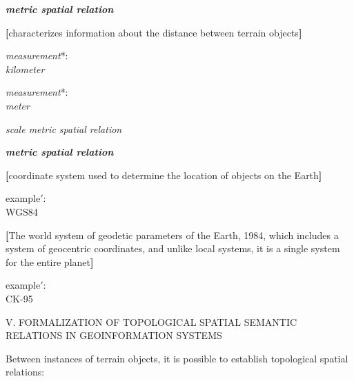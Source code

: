 \documentclass{article}
\begin{document}
\begin{multicols}{2}
    \noindent \textit{\textbf{metric spatial relation}}
    \vspace{-0.3cm}
    \begin{description}[leftmargin=!, labelwidth=1cm, itemsep=-1.5mm]
        \item[$\coloneqq$] \textbf{[}characterizes information about the distance between terrain objects\textbf{]}
        \item[$\Rightarrow$] \textit{measurement}*: \\ \textit{kilometer}
        \item[$\Rightarrow$] \textit{measurement}*: \\ \textit{meter}
        \item[$\supset$] \textit{scale metric spatial relation}
    \end{description}

        \noindent \textit{\textbf{metric spatial relation}}
    \vspace{-0.3cm}
    \begin{description}[leftmargin=!, labelwidth=1cm, itemsep=-1.5mm]
        \item[$\coloneqq$] \textbf{[}coordinate system used to determine the location of objects on the Earth\textbf{]}
        \item[$\ni$] example$'$: \\ WGS84
        \vspace{-0.3cm}
        \begin{description}[leftmargin=!, labelwidth=1cm, itemsep=-1.5mm]
            \item[$\coloneqq$] \textbf{[}The world system of geodetic parameters of the Earth, 1984, which includes a system of geocentric coordinates, and unlike local systems, it is a single system for the entire planet\textbf{]}
        \end{description}
        \item[$\ni$] example$'$: \\ CK-95
    \end{description}

    \begin{center}
        V. FORMALIZATION OF TOPOLOGICAL SPATIAL SEMANTIC RELATIONS IN GEOINFORMATION SYSTEMS
    \end{center}    

    Between instances of terrain objects, it is possible to establish topological spatial relations: \\
    \columnbreak
    

\end{multicols}
\end{document}
